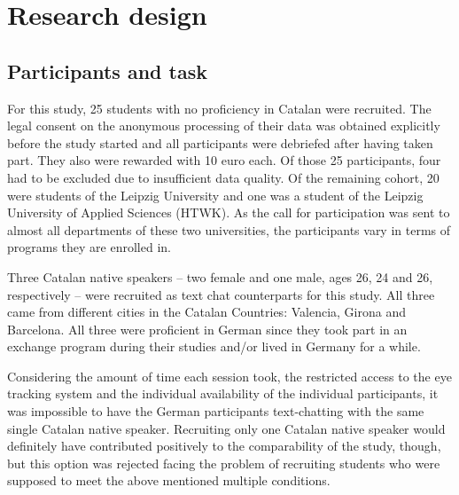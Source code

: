 \documentclass[output=paper,colorlinks,citecolor=brown]{langscibook}
\begin{document}
\section{Research design}
\label{sec:Rdesign}

\subsection{Participants and task}
\label{subsec:parttask}


For this study, 25 students with no proficiency in Catalan were recruited. The legal consent on the anonymous processing of their data was obtained explicitly before the study started and all participants were debriefed after having taken part. They also were rewarded with 10 euro each. Of those 25 participants, four had to be excluded due to insufficient data quality. Of the remaining cohort, 20 were students of the Leipzig University and one was a student of the Leipzig University of Applied Sciences (HTWK). As the call for participation was sent to almost all departments of these two universities, the participants vary in terms of programs they are enrolled in.

Three Catalan native speakers -- two female and one male, ages 26, 24 and 26, respectively -- were recruited as text chat counterparts for this study. All three came from different cities in the Catalan Countries: Valencia, Girona and Barcelona. All three were proficient in German since they took part in an exchange program during their studies and/or lived in Germany for a while.

Considering the amount of time each session took, the restricted access to the eye tracking system and the individual availability of the individual participants, it was impossible to have the German participants text-chatting with the same single Catalan native speaker. Recruiting only one Catalan native speaker would definitely have contributed positively to the comparability of the study, though, but this option was rejected facing the problem of recruiting students who were supposed to meet the above mentioned multiple conditions.
\end{document}
